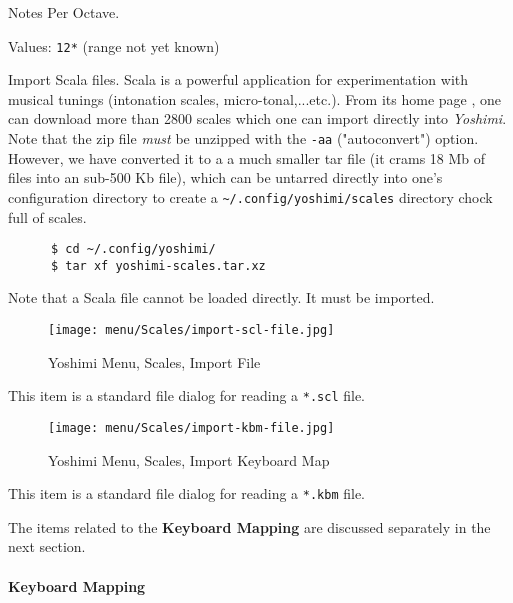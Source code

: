    Notes Per Octave.

   Values: \texttt{12*} (range not yet known)

   Import Scala files.
   Scala is a powerful application for experimentation with musical tunings
   (intonation scales, micro-tonal,...etc.). From its home page \cite{scala},
   one can download more than 2800 scales which one can import directly into
   \textsl{Yoshimi}.  Note that the zip file \textsl{must} be unzipped with
   the \texttt{-aa} ("autoconvert") option.  However, we have converted it to a
   a much smaller tar file (it crams 18 Mb of files into an sub-500 Kb file),
   which can be untarred directly into
   one's configuration directory to create a
   \texttt{\textasciitilde/.config/yoshimi/scales} directory chock full of
   scales.

    \begin{verbatim}
      $ cd ~/.config/yoshimi/
      $ tar xf yoshimi-scales.tar.xz
    \end{verbatim}

    Note that a Scala file cannot be loaded directly.  It must be imported.

\begin{figure}[H]
   \centering 
   \texttt{[image: menu/Scales/import-scl-file.jpg]}
   \caption{Yoshimi Menu, Scales, Import File}
   \label{fig:yoshimi_menu_scales_import_file}
\end{figure}

   This item is a standard file dialog for reading
   a \texttt{*.scl} file.

\begin{figure}[H]
   \centering 
   \texttt{[image: menu/Scales/import-kbm-file.jpg]}
   \caption{Yoshimi Menu, Scales, Import Keyboard Map}
   \label{fig:yoshimi_menu_scales_import_keyboard_map}
\end{figure}

   This item is a standard file dialog for reading
   a \texttt{*.kbm} file.


   The items related to the \textbf{Keyboard Mapping} are discussed
   separately in the next section.

\paragraph{Keyboard Mapping}
\label{paragraph:menu_scales_keyboard_mapping}

